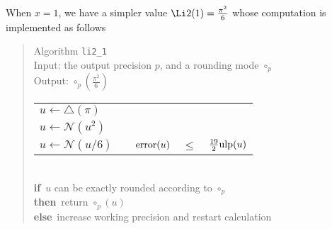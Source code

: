 \documentclass[12pt]{amsart}
\def\n{\textnormal}
\def\pinf{\bigtriangleup}
\def\ulp{{\rm ulp}}
\def\N{{\mathcal N}}
\def\If{{\bf if}}
\def\then{{\bf then}}
\def\Else{{\bf else}}
\begin{document}
When $x=1$, we have a simpler value $\Li2(1) = \frac{\pi^2}{6}$ whose
computation is implemented as follows

\begin{quote}
Algorithm {\tt li2\_1}\\
Input: the output precision $p$, and a rounding mode $\circ_p$ \\
Output: $\circ_p(\frac{\pi^2}{6})$ \\
\begin{tabular}{l c r c l}
$u \leftarrow \pinf(\pi)$ \\
$u \leftarrow \N(u^2)$ \\
$u \leftarrow \N(u/6)$ & &
$\n{error}(u) $ & $ \leq $ & $ \frac{19}{2}\ulp(u)$\\
\end{tabular}\\
\If\ $u$ can be exactly rounded according to $\circ_p$\\
\then\ return $\circ_p(u)$\\
\Else\ increase working precision and restart calculation
\end{quote}
\end{document}
